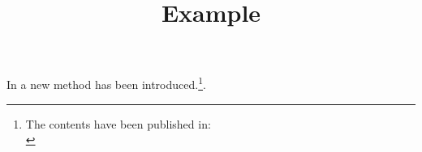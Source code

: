\documentclass[11pt,a4paper]{article}
\title{Example}
\author{}\date{}
\begin{document}
\nobibliography*%
In \cite{Amintoosi09regional} a new method has been introduced.\footnote{The contents have been published in:\\
}.


\end{document}
